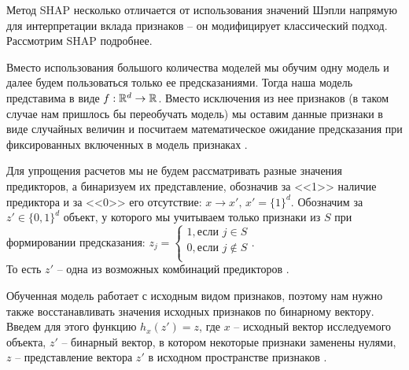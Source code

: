 Метод SHAP несколько отличается от использования значений Шэпли напрямую для интерпретации вклада признаков -- он модифицирует классический подход. Рассмотрим SHAP подробнее.

Вместо использования большого количества моделей мы обучим одну модель и далее будем пользоваться только ее предсказаниями. Тогда наша модель представима в виде $f: \mathbb{R}^d \rightarrow \mathbb{R}$. Вместо исключения из нее признаков (в таком случае нам пришлось бы переобучать модель) мы оставим данные признаки в виде случайных величин и посчитаем математическое ожидание предсказания при фиксированных включенных в модель признаках \cite{basis, shap}.

Для упрощения расчетов мы не будем рассматривать разные значения предикторов, а бинаризуем их представление, обозначив за <<1>> наличие предиктора и за <<0>> его отсутствие: $x \rightarrow x', \, x' = \{1\}^d$. %
Обозначим за $z' \in \{0,1\}^d$ объект, у которого мы учитываем только признаки из $S$ при формировании предсказания:
$z_j =
\begin{cases}
1, \text{если $j \in S$}\\
0, \text{если $j \notin S$}\\
\end{cases}$.\\
То есть $z'$ -- одна из возможных комбинаций предикторов \cite{basis, shap}.

Обученная модель работает с исходным видом признаков, поэтому нам нужно также восстанавливать значения исходных признаков по бинарному вектору. Введем для этого функцию $h_x(z') = z$, где $x$ -- исходный вектор исследуемого объекта, $z'$ -- бинарный вектор, в котором некоторые признаки заменены нулями, $z$ -- представление вектора $z'$ в исходном пространстве признаков \cite{basis}.

\vspace{-3mm}
\begin{figure}[h]
\end{figure}
\vspace{-3mm}

